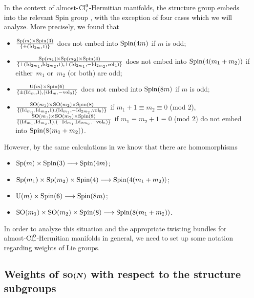 \documentclass[10pt,a4paper]{amsart}
\numberwithin{equation}{section}
\begin{document}
In the context of almost-${\rm Cl}_r^0$-Hermitian manifolds, the structure group embeds into the relevant Spin group \cite[Theorem~4.1]{Arizmendi-Garcia-Herrera}, with the exception of four cases which we will analyze. More precisely, we found that
\begin{itemize}\itemsep=0pt
 \item ${{\rm Sp}(m)\times {\rm Spin}(3)\over \{\pm ({\rm Id}_{2m},1)\}}$ does not embed into ${\rm Spin}(4m)$ if $m$ is odd;
 \item ${{\rm Sp}(m_1)\times {\rm Sp}(m_2)\times {\rm Spin}(4)\over \{\pm ({\rm Id}_{2m_1},{\rm Id}_{2m_2},1),\pm ({\rm Id}_{2m_1},-{\rm Id}_{2m_2},{\rm vol}_4)\}}$ does not embed into ${\rm Spin}(4(m_1+m_2))$ if either~$m_1$ or~$m_2$ (or both) are odd;
 \item ${{\rm U}(m)\times {\rm Spin}(6)\over\{\pm ({\rm Id}_m,1),(i{\rm Id}_m, -{\rm vol}_6)\}}$ does not embed into
 ${\rm Spin}(8m)$ if $m$ is odd;
 \item ${{\rm SO}(m_1)\times {\rm SO}(m_2)\times {\rm Spin}(8)\over \{({\rm Id}_{m_1},{\rm Id}_{m_2},1),({\rm Id}_{m_1},-{\rm Id}_{2m_2},{\rm vol}_8)\}}$ if $m_1+1\equiv m_2\equiv 0$ (mod 2), %
 ${{\rm SO}(m_1)\times {\rm SO}(m_2)\times {\rm Spin}(8)\over \{({\rm Id}_{m_1},{\rm Id}_{m_2},1),(-{\rm Id}_{m_1},{\rm Id}_{2m_2},-{\rm vol}_8)\}}$ if $m_1\equiv m_2+1\equiv 0$ (mod 2)
 do not embed into ${\rm Spin}(8(m_1+m_2))$.
\end{itemize}
However, by the same calculations in \cite{Arizmendi-Garcia-Herrera} we know that there are homomorphisms
\begin{itemize}\itemsep=0pt
 \item ${\rm Sp}(m)\times {\rm Spin}(3)\longrightarrow {\rm Spin}(4m)$;
\item ${\rm Sp}(m_1)\times {\rm Sp}(m_2)\times {\rm Spin}(4)\longrightarrow {\rm Spin}(4(m_1+m_2))$;
\item ${\rm U}(m)\times {\rm Spin}(6)\longrightarrow {\rm Spin}(8m)$;
\item ${\rm SO}(m_1)\times {\rm SO}(m_2)\times {\rm Spin}(8)\longrightarrow {\rm Spin}(8(m_1+m_2))$.
\end{itemize}

In order to analyze this situation and the appropriate twisting bundles for almost-${\rm Cl}_r^0$-Hermitian manifolds in general, we need to set up some notation regarding weights of Lie groups.

\subsection[Weights of ${\rm SO}(N)$ with respect to the structure subgroups]{Weights of $\boldsymbol{{\rm SO}(N)}$ with respect to the structure subgroups}\label{subsec: weights}
\end{document}
